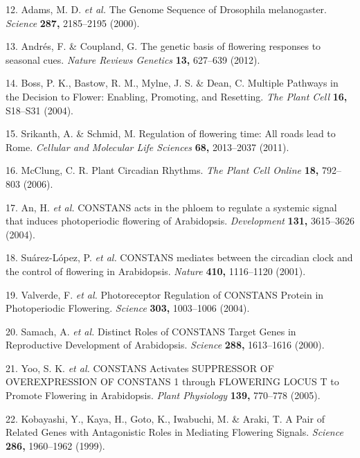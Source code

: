\documentclass[12pt,]{book}
\begin{document}
\hypertarget{ref-adams_genome_2000}{}
12. Adams, M. D. \emph{et al.} The Genome Sequence of Drosophila
melanogaster. \emph{Science} \textbf{287,} 2185--2195 (2000).

\hypertarget{ref-andres_genetic_2012}{}
13. Andrés, F. \& Coupland, G. The genetic basis of flowering responses
to seasonal cues. \emph{Nature Reviews Genetics} \textbf{13,} 627--639
(2012).

\hypertarget{ref-boss_multiple_2004}{}
14. Boss, P. K., Bastow, R. M., Mylne, J. S. \& Dean, C. Multiple
Pathways in the Decision to Flower: Enabling, Promoting, and Resetting.
\emph{The Plant Cell} \textbf{16,} S18--S31 (2004).

\hypertarget{ref-srikanth_regulation_2011}{}
15. Srikanth, A. \& Schmid, M. Regulation of flowering time: All roads
lead to Rome. \emph{Cellular and Molecular Life Sciences} \textbf{68,}
2013--2037 (2011).

\hypertarget{ref-mcclung_plant_2006}{}
16. McClung, C. R. Plant Circadian Rhythms. \emph{The Plant Cell Online}
\textbf{18,} 792--803 (2006).

\hypertarget{ref-an_constans_2004}{}
17. An, H. \emph{et al.} CONSTANS acts in the phloem to regulate a
systemic signal that induces photoperiodic flowering of Arabidopsis.
\emph{Development} \textbf{131,} 3615--3626 (2004).

\hypertarget{ref-suarez_lopez_constans_2001}{}
18. Suárez-López, P. \emph{et al.} CONSTANS mediates between the
circadian clock and the control of flowering in Arabidopsis.
\emph{Nature} \textbf{410,} 1116--1120 (2001).

\hypertarget{ref-valverde_photoreceptor_2004}{}
19. Valverde, F. \emph{et al.} Photoreceptor Regulation of CONSTANS
Protein in Photoperiodic Flowering. \emph{Science} \textbf{303,}
1003--1006 (2004).

\hypertarget{ref-samach_distinct_2000}{}
20. Samach, A. \emph{et al.} Distinct Roles of CONSTANS Target Genes in
Reproductive Development of Arabidopsis. \emph{Science} \textbf{288,}
1613--1616 (2000).

\hypertarget{ref-yoo_constans_2005}{}
21. Yoo, S. K. \emph{et al.} CONSTANS Activates SUPPRESSOR OF
OVEREXPRESSION OF CONSTANS 1 through FLOWERING LOCUS T to Promote
Flowering in Arabidopsis. \emph{Plant Physiology} \textbf{139,} 770--778
(2005).

\hypertarget{ref-kobayashi_pair_1999}{}
22. Kobayashi, Y., Kaya, H., Goto, K., Iwabuchi, M. \& Araki, T. A Pair
of Related Genes with Antagonistic Roles in Mediating Flowering Signals.
\emph{Science} \textbf{286,} 1960--1962 (1999).
\end{document}
